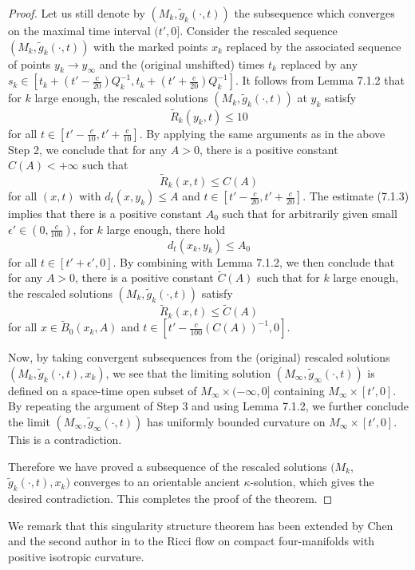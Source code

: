 \begin{proof}
Let us still denote by $(M_k,\tilde{g}_k(\cdot,t))$ the
subsequence which converges on the maximal time interval
$(t'\!,0]$. Consider the rescaled sequence
$(\!M_k,\tilde{g}_k(\cdot,t))$ with the marked points $x_k$
replaced by the associated sequence of points $y_k \rightarrow
y_{\infty}$ and the (original unshifted) times $t_k$ replaced by
any $s_k \in
[t_k+(t'-\frac{c}{20})Q_k^{-1},t_k+(t'+\frac{c}{20})Q_k^{-1}]$. It
follows from Lemma 7.1.2 that for $k$ large enough, the rescaled
solutions $(M_k,\tilde{g}_k(\cdot,t))$ at $y_k$ satisfy
$$
\tilde{R}_k(y_k,t) \leq 10
$$
for all $t \in [t'-\frac{c}{10},t'+\frac{c}{10}]$. By applying the
same arguments as in the above Step 2, we conclude that for any $A
> 0$, there is a positive constant $C(A)<+\infty$ such that
$$
\tilde{R}_k(x,t) \leq C(A)
$$
for all $(x,t)$ with ${d}_t(x,y_k) \leq A$ and $t \in
[t'-\frac{c}{20},t'+\frac{c}{20}]$. The estimate (7.1.3) implies
that there is a positive constant $A_0$ such that for arbitrarily
given small $\epsilon' \in(0,\frac{c}{100})$, for $k$ large
enough, there hold
$$
{d}_t(x_k,y_k) \leq A_0
$$
for all $t \in [t'+ \epsilon',0]$. By combining with Lemma 7.1.2,
we then conclude that for any $A>0$, there is a positive constant
$\tilde{C}(A)$ such that for $k$ large enough, the rescaled
solutions $(M_k,\tilde{g}_k(\cdot,t))$ satisfy
$$
\tilde{R}_k(x,t) \leq \tilde{C}(A)
$$
for all $x \in \tilde{B}_0(x_k,A)$ and $t \in [t' -
\frac{c}{100}(C(A))^{-1},0]$.

Now, by taking convergent subsequences from the (original)
rescaled solutions $(M_k,\tilde{g}_k(\cdot,t),x_k)$, we see that
the limiting solution $(M_{\infty},\tilde{g}_{\infty}(\cdot,t))$
is defined on a space-time open subset of $M_{\infty} \times
(-\infty,0]$ containing $M_{\infty} \times [t',0]$. By repeating
the argument of Step 3 and using Lemma 7.1.2, we further conclude
the limit $(M_{\infty},\tilde{g}_{\infty}(\cdot,t))$ has uniformly
bounded curvature on $M_{\infty} \times [t',0]$. This is a
contradiction.

Therefore we have proved a subsequence of the rescaled solutions
$(M_k,$ $\tilde{g}_k(\cdot,t),x_k)$ converges to an orientable
ancient $\kappa$-solution, which gives the desired contradiction.
This completes the proof of the theorem.
\end{proof}

We remark that this singularity structure theorem has been
extended by Chen and the second author in \cite{CZ05F} to the
Ricci flow on compact four-manifolds with positive isotropic
curvature.


